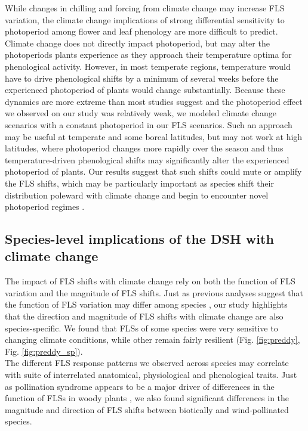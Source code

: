 \documentclass[12pt]{article}\usepackage[]{graphicx}\usepackage[]{color}
\begin{document}
\noindent While changes in chilling and forcing from climate change may increase FLS variation, the climate change implications of strong differential sensitivity to photoperiod among flower and leaf phenology are more difficult to predict. Climate change does not directly impact photoperiod, but may alter the photoperiods plants experience as they approach their temperature optima for phenological activity. However, in most temperate regions, temperature would have to drive phenological shifts by a minimum of several weeks before the experienced photoperiod of plants would change substantially. %
Because these dynamics are more extreme than most studies suggest \citep{Thackeray:2016aa} and the photoperiod effect we observed on our study was relatively weak, we modeled climate change scenarios with a constant photoperiod in our FLS scenarios. Such an approach may be useful at temperate and some boreal latitudes, but may not work at high latitudes, where photoperiod changes more rapidly over the season and thus temperature-driven phenological shifts may significantly alter the experienced photoperiod of plants. Our results suggest that such shifts could mute or amplify the FLS shifts, which may be particularly important as species shift their distribution poleward with climate change and begin to encounter novel photoperiod regimes \citep{WAY:2015aa}.\\

\subsection*{Species-level implications of the DSH with climate change}
\noindent The impact of FLS shifts with climate change rely on both the function of FLS variation and the magnitude of FLS shifts. Just as previous analyses suggest that the function of FLS variation may differ among species \citep{Buonaiuto2020,Gougherty2018}, our study highlights that the direction and magnitude of FLS shifts with climate change are also species-specific. We found that FLSs of some species were very sensitive to changing climate conditions, while other remain fairly resilient (Fig. \ref{fig:preddy}, Fig. \ref{fig:preddy_sp}).\\

\noindent The different FLS response patterns we observed across species may correlate with suite of interrelated anatomical, physiological and phenological traits. Just as pollination syndrome appears to be a major driver of differences in the function of FLSs in woody plants \citep{Buonaiuto2020}, we also found significant differences in the magnitude and direction of FLS shifts between biotically and wind-pollinated species.\\
\end{document}
